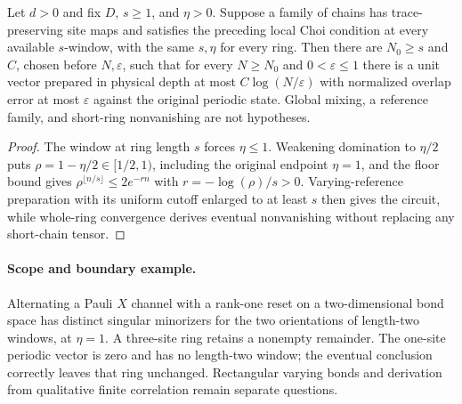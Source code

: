 \begin{lemma}
    \label{thm:ldp_window_mixing_preparation}
    \leanok
    Let $d>0$ and fix $D$, $s\ge1$, and $\eta>0$. Suppose a family of
    chains has trace-preserving site maps and satisfies the
    preceding local Choi condition at every available $s$-window, with
    the same $s,\eta$ for every ring. Then there are $N_0\ge s$ and $C$,
    chosen before $N,\varepsilon$, such that for every $N\ge N_0$ and
    $0<\varepsilon\le1$ there is a unit vector prepared in physical depth at most
    $C\log(N/\varepsilon)$ with normalized overlap error at most
    $\varepsilon$ against the original periodic state.
    Global mixing, a reference family, and short-ring nonvanishing are
    not hypotheses.
\end{lemma}
\begin{proof}\leanok
    The window at ring length $s$ forces $\eta\le1$. Weakening
    domination to $\eta/2$ puts $\rho=1-\eta/2\in[1/2,1)$, including
    the original endpoint $\eta=1$, and the floor bound gives
    $\rho^{\lfloor n/s\rfloor}\le2e^{-rn}$ with
    $r=-\log(\rho)/s>0$. Varying-reference preparation with its uniform
    cutoff enlarged to at least $s$ then gives the circuit, while
    whole-ring convergence derives eventual nonvanishing without replacing
    any short-chain tensor.
\end{proof}

\paragraph{Scope and boundary example.}
Alternating a Pauli $X$ channel with a rank-one reset on a two-dimensional
bond space has distinct singular minorizers for the two orientations of
length-two windows, at $\eta=1$. A three-site ring retains a nonempty
remainder. The one-site periodic vector is zero and has no length-two
window; the eventual conclusion correctly leaves that ring unchanged.
Rectangular varying bonds and derivation from qualitative finite
correlation remain separate questions.
